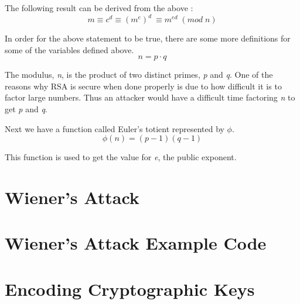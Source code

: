 \documentclass[11pt]{article}
\begin{document}
The following result can be derived from the above \cite{boneh}:
$$ m \equiv c^d  \equiv (m^{e})^d\ \equiv m^{ed}\; (mod \; n)$$

In order for the above statement to be true, there are some more definitions for some of the variables defined above. 
$$ n = p \cdot q $$

The modulus, \emph{n}, is the product of two distinct primes, \emph{p} and \emph{q}. One of the reasons why RSA is secure when done properly is due to how difficult it is to factor large numbers. Thus an attacker would have a difficult time factoring \emph{n} to get \emph{p} and \emph{q}.

Next we have a function called Euler's totient represented by $\phi$.
$$ \phi(n) = (p - 1)(q - 1)$$

This function is used to get the value for \emph{e}, the public exponent.

\section{Wiener's Attack}

\medskip




\begin{appendices}
\section{Wiener's Attack Example Code}
\section{Encoding Cryptographic Keys}
\label{appendix:pem}
\end{appendices}
\end{document}
